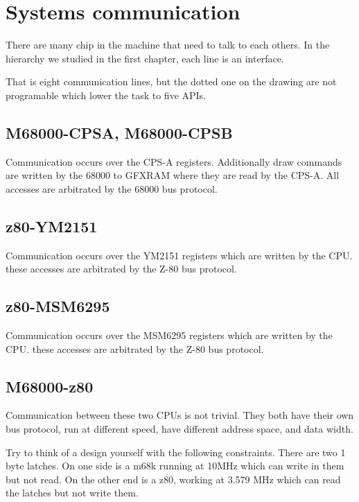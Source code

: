 \section{Systems communication}

There are many chip in the machine that need to talk to each others. In the hierarchy we studied in the first chapter, each line is an interface. 


That is eight communication lines, but the dotted one on the drawing are not programable which lower the task to five APIs.

\subsection{M68000-CPSA, M68000-CPSB} Communication occurs over the CPS-A registers. Additionally draw commands are written by the 68000 to GFXRAM where they are read by the CPS-A. All accesses are arbitrated by the 68000 bus protocol.

\subsection{z80-YM2151} Communication occurs over the YM2151 registers which are written by the CPU. these accesses are arbitrated by the Z-80 bus protocol.

\subsection{z80-MSM6295} Communication  occurs over the MSM6295 registers which are written by the CPU. these accesses are arbitrated by the Z-80 bus protocol. 

\subsection{M68000-z80} Communication between these two CPUs is not trivial. They both have their own bus protocol, run at different speed, have different address space, and data width.

Try to think of a design yourself with the following constraints. There are two 1 byte latches. On one side is a m68k running at 10MHz which can write in them but not read. On the other end is a z80, working at 3.579 MHz which can read the latches but not write them. 


